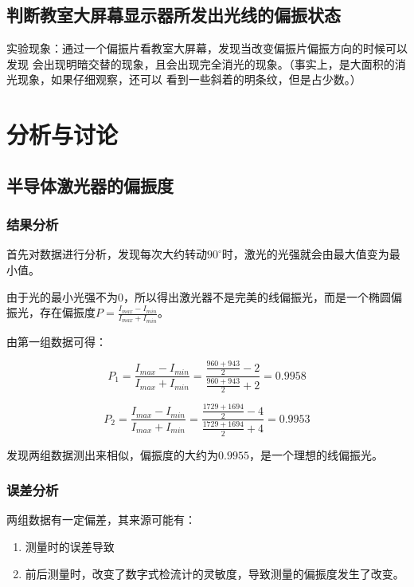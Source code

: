 \documentclass[a4paper,UTF8]{ctexart}
\begin{document}
\subsection{判断教室大屏幕显示器所发出光线的偏振状态}

实验现象：通过一个偏振片看教室大屏幕，发现当改变偏振片偏振方向的时候可以发现
会出现明暗交替的现象，且会出现完全消光的现象。（事实上，是大面积的消光现象，如果仔细观察，还可以
看到一些斜着的明条纹，但是占少数。）

\section{分析与讨论}

\subsection{半导体激光器的偏振度}

\subsubsection{结果分析}

首先对数据进行分析，发现每次大约转动$90^\circ$时，激光的光强就会由最大值变为最小值。

由于光的最小光强不为0，所以得出激光器不是完美的线偏振光，而是一个椭圆偏振光，存在偏振度$P = \frac{I_{max}-I_{min}}{I_{max}+I_{min}}$。

由第一组数据可得：

\begin{equation}
    P_1 = \frac{I_{max}-I_{min}}{I_{max}+I_{min}} = \frac{\frac{960+943}{2}-2}{\frac{960+943}{2}+2}=0.9958
\end{equation}

\begin{equation}
    P_2 = \frac{I_{max}-I_{min}}{I_{max}+I_{min}} = \frac{\frac{1729+1694}{2}-4}{\frac{1729+1694}{2}+4}=0.9953
\end{equation}

发现两组数据测出来相似，偏振度的大约为$0.9955$，是一个理想的线偏振光。

\subsubsection{误差分析}

两组数据有一定偏差，其来源可能有：

\begin{enumerate}
    \item 测量时的误差导致
    \item 前后测量时，改变了数字式检流计的灵敏度，导致测量的偏振度发生了改变。
\end{enumerate}
\end{document}
